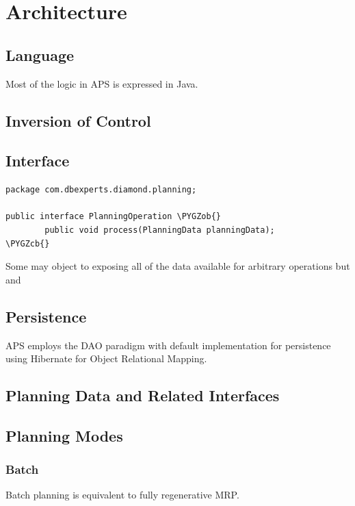 \documentclass[letterpaper,10pt,english]{sphinxmanual}
\def\PYGZob{\char`\{}
\def\PYGZcb{\char`\}}
\begin{document}
\chapter{Architecture}
\label{APS/Technical:architecture}

\section{Language}
\label{APS/Technical:language}
Most of the logic in APS is expressed in Java.


\section{Inversion of Control}
\label{APS/Technical:inversion-of-control}

\section{Interface}
\label{APS/Technical:interface}
\begin{Verbatim}[commandchars=\\\{\}]
package com.dbexperts.diamond.planning;

public interface PlanningOperation \PYGZob{}
        public void process(PlanningData planningData);
\PYGZcb{}
\end{Verbatim}

Some may object to exposing all of the data available for arbitrary
operations but and


\section{Persistence}
\label{APS/Technical:persistence}
APS employs the DAO paradigm with default implementation for persistence
using Hibernate for Object Relational Mapping.


\section{Planning Data and Related Interfaces}
\label{APS/Technical:planning-data-and-related-interfaces}

\section{Planning Modes}
\label{APS/Technical:planning-modes}

\subsection{Batch}
\label{APS/Technical:batch}
Batch planning is equivalent to fully regenerative MRP.
\end{document}
